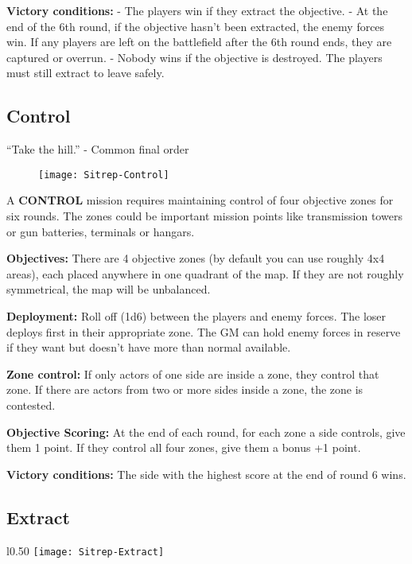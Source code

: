  \textbf{Victory conditions:}
 - The players win if they extract the objective.
 - At the end of the 6th round, if the objective hasn’t been extracted, the enemy forces win. If any players are left on the battlefield after the 6th round ends, they are captured or overrun.
 - Nobody wins if the objective is destroyed. The players must still extract to leave safely.
 \newpage
 \subsection{Control}

 “Take the hill.” - Common final order

 \begin{figure}\begin{center}
   \texttt{[image: Sitrep-Control]}
 \end{center}\end{figure}

 A \textbf{CONTROL} mission requires maintaining control of four objective zones for six rounds. The zones could be important mission points like transmission towers or gun batteries, terminals or hangars.

 \textbf{Objectives:} There are 4 objective zones (by default you can use roughly 4x4 areas), each placed anywhere in one quadrant of the map. If they are not roughly symmetrical, the map will be unbalanced.

 \textbf{Deployment:} Roll off (1d6) between the players and enemy forces. The loser deploys first in their appropriate zone. The GM can hold enemy forces in reserve if they want but doesn’t have more than normal available.

 \textbf{Zone control:} If only actors of one side are inside a zone, they control that zone. If there are actors from two or more sides inside a zone, the zone is contested.

 \textbf{Objective Scoring:} At the end of each round, for each zone a side controls, give them 1 point. If they control all four zones, give them a bonus +1 point.

 \textbf{Victory conditions:} The side with the highest score at the end of round 6 wins.

 \newpage
 \subsection{Extract}

 \begin{wrapfigure}{l}{0.50\textwidth}
   \centering
   \texttt{[image: Sitrep-Extract]}
 \end{wrapfigure}

